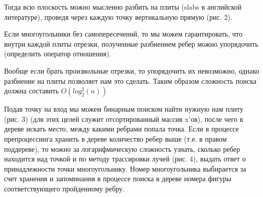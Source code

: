 Тогда всю плоскость можно мысленно разбить на плиты (slabs в английской литературе), проведя через каждую точку вертикальную прямую (рис. 2). 

Если многоугольники без самопересечений, то мы можем гарантировать, что внутри каждой плиты отрезки, полученные разбиением ребер можно упорядочить (определить оператор отношения).
 
Вообще если брать произвольные отрезки, то упорядочить их невозможно, однако разбиение на плиты позволяет нам это сделать. Таким образом сложность поиска должна составить $O(log_2^2(n))$  

\begin{figure}[h]
\end{figure}

Подав точку на вход мы можем бинарным поиском найти нужную нам плиту (рис. 3) (для этих целей служит отсортированный массив x'ов), после чего в дереве искать место, между какими ребрами попала точка. Если в процессе препроцессинга хранить в дереве количество ребер выше (т.е. в правом поддереве), то можно за логарифмическую сложность узнать, сколько ребер находится над точкой и по методу трассировки лучей (рис. 4), выдать ответ о принадлежности точки многоугольнику. Номер многоугольника выбирается за счет хранения и запоминания в процессе поиска в дереве номера фигуры соответствующего пройденному ребру.

